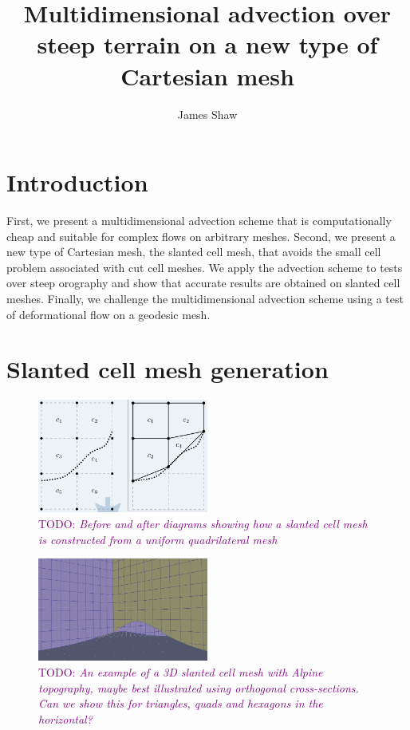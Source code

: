 \documentclass{article}
\title{Multidimensional advection over steep terrain on a new type of Cartesian mesh \\ \TODO{(working title)}}
\author{James Shaw}
\newcommand{\TODO}[1]{\textcolor{purple}{TODO: \emph{#1}}}
\begin{document}
\maketitle

\section{Introduction}

First, we present a multidimensional advection scheme that is computationally cheap and suitable for complex flows on arbitrary meshes.  Second, we present a new type of Cartesian mesh, the slanted cell mesh, that avoids the small cell problem associated with cut cell meshes.   We apply the advection scheme to tests over steep orography and show that accurate results are obtained on slanted cell meshes.  Finally, we challenge the multidimensional advection scheme using a test of deformational flow on a geodesic mesh.

\section{Slanted cell mesh generation}

\begin{figure}
	\includegraphics[width=0.5\textwidth]{slantCellConstruction.png}
	\caption{\TODO{Before and after diagrams showing how a slanted cell mesh is constructed from a uniform quadrilateral mesh}}
\end{figure}

\begin{figure}
	\includegraphics[width=0.5\textwidth]{3dslices.png}
	\caption{\TODO{An example of a 3D slanted cell mesh with Alpine topography, maybe best illustrated using orthogonal cross-sections.  Can we show this for triangles, quads and hexagons in the horizontal?}}
\end{figure}
\end{document}
